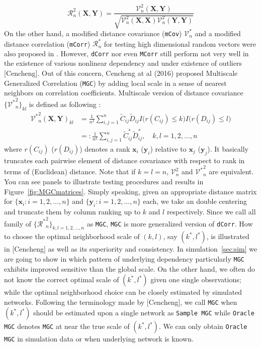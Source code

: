 \documentclass[12pt]{article}
\theoremstyle{definition}
\begin{document}
\begin{equation}	 
\mathcal{R}_{n}^{2} (\mathbf{X}, \mathbf{Y}) = \frac{\mathcal{V}^2_{n} (\mathbf{X}, \mathbf{Y}) }{\sqrt{\mathcal{V}^2_{n} (\mathbf{X}, \mathbf{X}) \mathcal{V}^2_{n} (\mathbf{Y}, \mathbf{Y}) } }
\end{equation}
On the other hand, a modified distance covariance (\texttt{mCov}) $\mathcal{V}^*_{n}$ and a modified distance correlation (\texttt{mCorr}) $\mathcal{R}^{*}_{n}$ for testing high dimensional random vectors were also proposed in \cite{szekely2013distance}.   
However, \texttt{dCorr} nor even \texttt{MCorr} still perform not very well in the existence of various nonlinear dependency and under existence of outliers [Cencheng]. Out of this concern, Cencheng at al (2016) proposed Multiscale Generalized Correlation (\texttt{MGC}) by adding local scale in a sense of nearest neighbors on correlation coefficients. Multiscale version of distance covariance $\{ { {\mathcal{V}^{*}}^2_{n} }   \}_{kl}$ is defined as following : 
\begin{equation}
\label{eq:MGC}
\begin{split}
{\mathcal{V}^{*}}^2_{n} (\mathbf{X}, \mathbf{Y})_{kl}  & = \frac{1}{n^2} \sum\limits_{i,j=1}^{n} \tilde{C}_{ij} \tilde{D}_{ij} I \big( r(C_{ij}) \leq k \big) I \big( r(D_{ij}) \leq l  \big) \\  
& = : \frac{1}{n^2} \sum\limits_{i,j=1}^{n} \tilde{C}^{*}_{ij} \tilde{D}^{*}_{ij},
\quad k,l=1,2,..., n 
\end{split}
\end{equation}
where $r(C_{ij})$ ($r(D_{ij})$) denotes a rank $\mathbf{x}_{i}$ ($\mathbf{y}_{i}$) relative to $\mathbf{x}_{j}$ ($\mathbf{y}_{j}$). It basically truncates each pairwise element of distance covariance with respect to rank in terms of (Euclidean) distance. Note that if $k=l=n$, $\mathcal{V}^2_{n}$ and ${\mathcal{V}^{*}}^2_{n}$ are equivalent. You can see panels to illustrate testing procedures and results in Figure~\ref{fig:MGCmatrices}. Simply speaking, given an appropriate distance matrix for $\{  \mathbf{x}_{i}  : i = 1,2, \ldots, n \}$ and $\{ \mathbf{y}_{i} : i=1,2,\ldots, n \}$ each, we take an double centering and truncate them by column ranking up to $k$ and $l$ respectively. Since we call all family of $\{  {\mathcal{R}^{*}}^2_{n} \}_{k,l = 1,2,...,n}$ as \texttt{MGC}, \texttt{MGC} is more generalized version of \texttt{dCorr}. How to choose the optimal neighborhood scale of $(k,l)$, say $(k^{*}, l^{*})$, is illustrated in [Cencheng] as well as its superiority and consistency. In simulation~\ref{sec:sim} we are going to show in which pattern of underlying dependency particularly \texttt{MGC} exhibits improved sensitive than the global scale. On the other hand, we often do not know the correct optimal scale of $(k^{*}, l^{*})$ given one single observations; while the optimal neighborhood choice can be closely estimated by simulated networks. Following the terminology made by [Cencheng], we call \texttt{MGC} when $(k^{*}, l^{*})$ should be estimated upon a single network as \texttt{Sample MGC} while \texttt{Oracle MGC} denotes \texttt{MGC} at near the true scale of $(k^{*}, l^{*})$. We can only obtain \texttt{Oracle MGC} in simulation data or when underlying network is known.  
	
\end{document}
